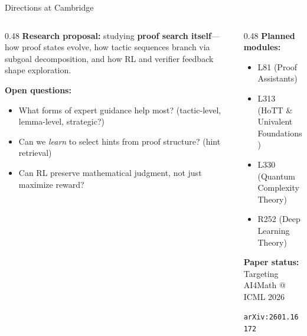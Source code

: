 \documentclass[aspectratio=169, 11pt]{beamer}
\begin{document}
\begin{frame}{Directions at Cambridge}

\begin{columns}[T]
\begin{column}{0.48\textwidth}
\textbf{Research proposal:} studying \textbf{proof search itself}---how proof states evolve, how tactic sequences branch via subgoal decomposition, and how RL and verifier feedback shape exploration.

\vspace{0.4em}
\textbf{Open questions:}
\begin{itemize}
  \item What forms of expert guidance help most? (tactic-level, lemma-level, strategic?)
  \item Can we \emph{learn} to select hints from proof structure? (hint retrieval)
  \item Can RL preserve mathematical judgment, not just maximize reward?
\end{itemize}
\end{column}

\begin{column}{0.48\textwidth}
\textbf{Planned modules:}
\begin{itemize}
  \item L81 (Proof Assistants)
  \item L313 (HoTT \& Univalent Foundations)
  \item L330 (Quantum Complexity Theory)
  \item R252 (Deep Learning Theory)
\end{itemize}

\vspace{0.4em}
\textbf{Paper status:} Targeting AI4Math @ ICML 2026

\vspace{0.2em}
\centering
\texttt{arXiv:2601.16172}
\end{column}
\end{columns}
\end{frame}
\end{document}
